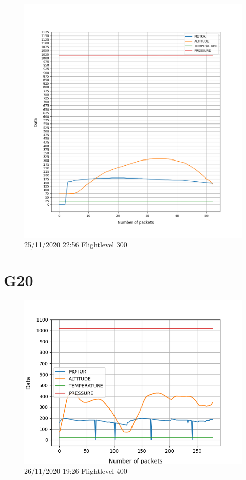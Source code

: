 \documentclass[hidelinks, 12pt, a4paper]{article}
\begin{document}
\begin{figure}[h!]
\centering
	\includegraphics[height=.38\textheight, width=\textwidth]{assets/session1/g19.png}
    \caption{25/11/2020 22:56 Flightlevel 300}
\end{figure}

\section{G20}

\begin{figure}[h!]
\centering
	\includegraphics[height=.38\textheight, width=\textwidth]{assets/session1/g20.png}
    \caption{26/11/2020 19:26 Flightlevel 400}
\end{figure}
\end{document}
